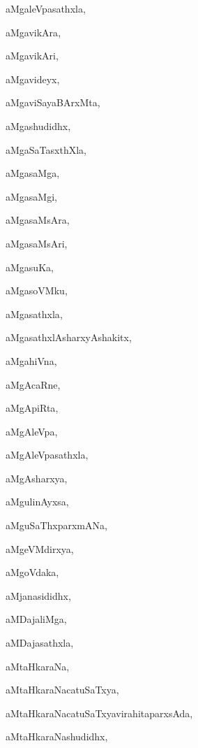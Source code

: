 \begin{multicols}{2}
{aMgaleVpasathxla}, \pageref{aMgaleVpasathxla}

{aMgavikAra}, \pageref{aMgavikAra}

{aMgavikAri}, \pageref{aMgavikAri}

{aMgavideyx}, \pageref{aMgavideyx}

{aMgaviSayaBArxMta}, \pageref{aMgaviSayaBArxMta}

{aMgashudidhx}, \pageref{aMgashudidhx}

{aMgaSaTasxthXla}, \pageref{aMgaSaTasxthXla}

{aMgasaMga}, \pageref{aMgasaMga}

{aMgasaMgi}, \pageref{aMgasaMgi}

{aMgasaMsAra}, \pageref{aMgasaMsAra}

{aMgasaMsAri}, \pageref{aMgasaMsAri}

{aMgasuKa}, \pageref{aMgasuKa}

{aMgasoVMku}, \pageref{aMgasoVMku}

{aMgasathxla}, \pageref{aMgasathxla}

{aMgasathxlAsharxyAshakitx}, \pageref{aMgasathxlAsharxyAshakitx}

{aMgahiVna}, \pageref{aMgahiVna}

{aMgAcaRne}, \pageref{aMgAcaRne}

{aMgApiRta}, \pageref{aMgApiRta}

{aMgAleVpa}, \pageref{aMgAleVpa}

{aMgAleVpasathxla}, \pageref{aMgAleVpasathxla}

{aMgAsharxya}, \pageref{aMgAsharxya}

{aMgulinAyxsa}, \pageref{aMgulinAyxsa}

{aMguSaThxparxmANa}, \pageref{aMguSaThxparxmANa}

{aMgeVMdirxya}, \pageref{aMgeVMdirxya}

{aMgoVdaka}, \pageref{aMgoVdaka}

{aMjanasididhx}, \pageref{aMjanasididhx}

{aMDajaliMga}, \pageref{aMDajaliMga}

{aMDajasathxla}, \pageref{aMDajasathxla}

{aMtaHkaraNa}, \pageref{aMtaHkaraNa}

{aMtaHkaraNacatuSaTxya}, \pageref{aMtaHkaraNacatuSaTxya}

{aMtaHkaraNacatuSaTxyavirahitaparxsAda}, \pageref{aMtaHkaraNacatuSaTxyavirahitaparxsAda}

{aMtaHkaraNashudidhx}, \pageref{aMtaHkaraNashudidhx}


\end{multicols}
